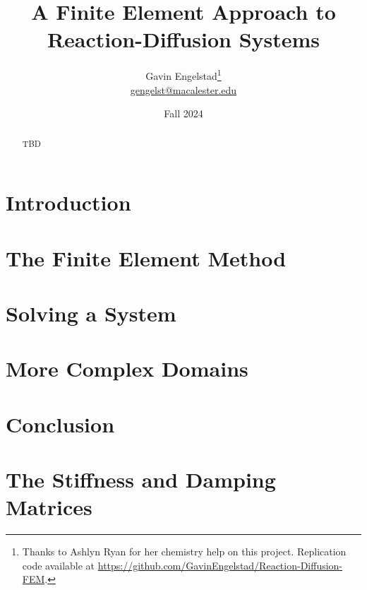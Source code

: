 \documentclass[11pt]{article}
\title{A Finite Element Approach to Reaction-Diffusion Systems}
\author{Gavin Engelstad\thanks{Thanks to Ashlyn Ryan for her chemistry help on this project. Replication code available at \url{https://github.com/GavinEngelstad/Reaction-Diffusion-FEM}.} \\ \href{mailto:gengelst@macalester.edu}{gengelst@macalester.edu}}
\date{Fall 2024}
\numberwithin{equation}{section} %
\numberwithin{figure}{section} %
\numberwithin{table}{section} %
\begin{document}
\maketitle

\begin{abstract}
    TBD
\end{abstract}


\section{Introduction} \label{sec:intro}


\section{The Finite Element Method} \label{sec:fem}



\section{Solving a System} \label{sec:sols}



\section{More Complex Domains} \label{sec:doms}



\section{Conclusion} \label{sec:concl}



\newpage
\printbibliography
\FloatBarrier


\newpage
\appendix

\section{The Stiffness and Damping Matrices} \label{app:mats}

\FloatBarrier
\end{document}
